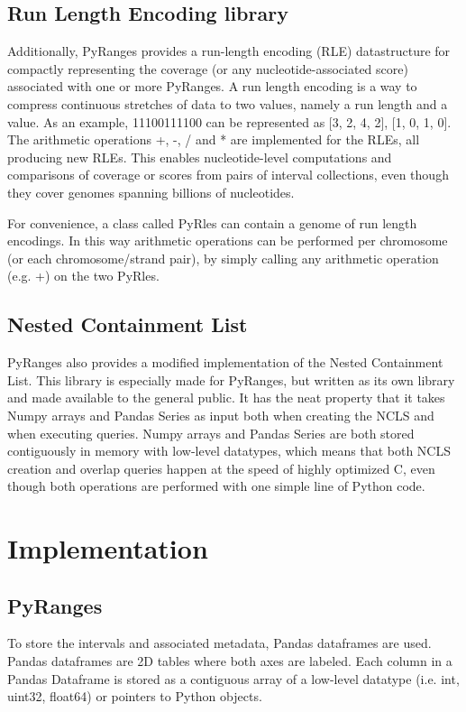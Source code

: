 \documentclass[10pt,letterpaper]{article}
\begin{document}
\subsection*{Run Length Encoding library}

Additionally, PyRanges provides a run-length encoding (RLE) datastructure for
compactly representing the coverage (or any nucleotide-associated score)
associated with one or more PyRanges. A run length encoding is a way to compress
continuous stretches of data to two values, namely a run length and a value. As
an example, 11100111100 can be represented as [3, 2, 4, 2], [1, 0, 1, 0]. The
arithmetic operations +, -, / and * are implemented for the RLEs, all producing
new RLEs. This enables nucleotide-level computations and comparisons of coverage
or scores from pairs of interval collections, even though they cover genomes
spanning billions of nucleotides.

For convenience, a class called PyRles can contain a genome of run length
encodings. In this way arithmetic operations can be performed per chromosome (or
each chromosome/strand pair), by simply calling any arithmetic operation (e.g.
+) on the two PyRles.

\subsection*{Nested Containment List}

PyRanges also provides a modified implementation of the Nested Containment List.
This library is especially made for PyRanges, but written as its own library and
made available to the general public. It has the neat property that it takes
Numpy arrays and Pandas Series as input both when creating the NCLS and when
executing queries. Numpy arrays and Pandas Series are both stored contiguously
in memory with low-level datatypes, which means that both NCLS creation and
overlap queries happen at the speed of highly optimized C, even though both
operations are performed with one simple line of Python code.

\section*{Implementation}

\subsection*{PyRanges}

To store the intervals and associated metadata, Pandas dataframes are used.
Pandas dataframes are 2D tables where both axes are labeled. Each column in a
Pandas Dataframe is stored as a contiguous array of a low-level datatype (i.e.
int, uint32, float64) or pointers to Python objects.
\end{document}
